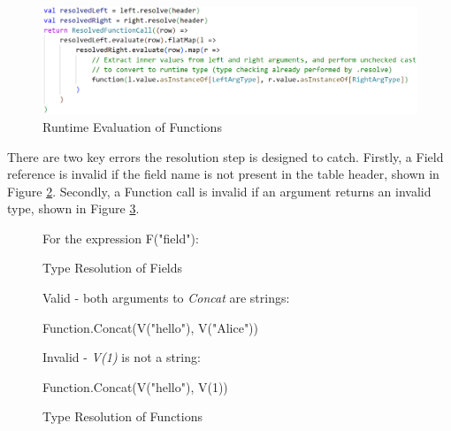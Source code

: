 \begin{figure}[htp]
	\centering
	\includegraphics[width=\textwidth]{chapters/diagrams/implementation/type-resolution-unchecked-casts}
	\caption{Runtime Evaluation of Functions}
	\label{fig:fieldexpression-unchecked-casts}
\end{figure}

There are two key errors the resolution step is designed to catch. Firstly, a Field reference is invalid if the field name is not present in the table header, shown in Figure \ref{fig:field-type-resolution}. Secondly, a Function call is invalid if an argument returns an invalid type, shown in Figure \ref{fig:function-type-resolution}.

\begin{figure}[htp]
	\centering
	For the expression F(\textcolor{deepgreen}{"field"}):
	
	\qquad
	\caption{Type Resolution of Fields}
	\label{fig:field-type-resolution}
\end{figure}

\begin{figure}[htp]
	Valid - both arguments to \textit{Concat} are strings:
	\begin{python}
Function.Concat(V("hello"), V("Alice"))
	\end{python}
	
	Invalid - \textit{V(1)} is not a string:
	\begin{python}
Function.Concat(V("hello"), V(1))
	\end{python}
	\caption{Type Resolution of Functions}
	\label{fig:function-type-resolution}
\end{figure}


